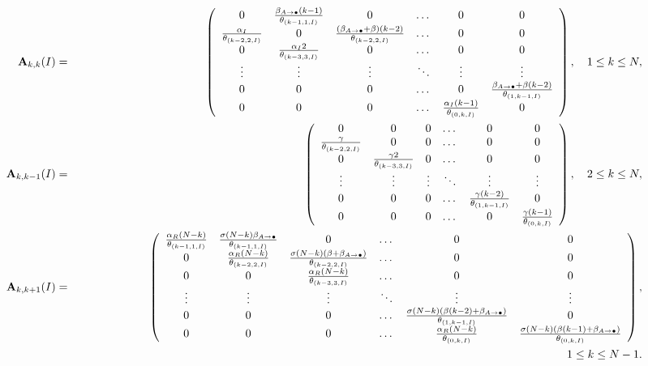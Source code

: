 \documentclass[preprint,12pt]{elsarticle}
\begin{document}
{\scriptsize
\begin{eqnarray*}
 {\bf A}_{k,k}(I) &=& \left(\begin{array}{cccccc}
0 & \frac{\beta_{A\rightarrow\bullet}(k-1)}{\theta_{(k-1,1,I)}} & 0 & \dots & 0 & 0\\
\frac{\alpha_I}{\theta_{(k-2,2,I)}} & 0 & \frac{(\beta_{A\rightarrow\bullet}+\beta)(k-2)}{\theta_{(k-2,2,I)}} & \dots & 0 & 0\\
0 & \frac{\alpha_I2}{\theta_{(k-3,3,I)}} & 0 & \dots & 0 & 0\\
\vdots & \vdots & \vdots & \ddots & \vdots & \vdots\\
0 & 0 & 0 & \dots & 0 & \frac{\beta_{A\rightarrow\bullet}+\beta(k-2)}{\theta_{(1,k-1,I)}}\\
0 & 0 & 0 & \dots & \frac{\alpha_I (k-1)}{\theta_{(0,k,I)}} & 0
                        \end{array}\right),\quad 1\leq k\leq N,\\
 {\bf A}_{k,k-1}(I) &=& \left(\begin{array}{cccccc}
0 & 0 & 0 & \dots & 0 & 0\\
\frac{\gamma}{\theta_{(k-2,2,I)}} & 0 & 0 & \dots & 0 & 0\\
0 & \frac{\gamma2}{\theta_{(k-3,3,I)}} & 0 & \dots & 0 & 0\\
\vdots & \vdots & \vdots & \ddots & \vdots & \vdots\\
0 & 0 & 0 & \dots & \frac{\gamma(k-2)}{\theta_{(1,k-1,I)}} & 0\\
0 & 0 & 0 & \dots & 0 & \frac{\gamma (k-1)}{\theta_{(0,k,I)}}
                        \end{array}\right),\quad 2\leq k\leq N,\\
 {\bf A}_{k,k+1}(I) &=& \left(\begin{array}{cccccc}
\frac{\alpha_R(N-k)}{\theta_{(k-1,1,I)}} & \frac{\sigma(N-k)\beta_{A\rightarrow\bullet}}{\theta_{(k-1,1,I)}} & 0 & \dots & 0 & 0\\
0 & \frac{\alpha_R(N-k)}{\theta_{(k-2,2,I)}} & \frac{\sigma(N-k)(\beta+\beta_{A\rightarrow\bullet})}{\theta_{(k-2,2,I)}} & \dots & 0 & 0\\
0 & 0 & \frac{\alpha_R(N-k)}{\theta_{(k-3,3,I)}} & \dots & 0 & 0\\
\vdots & \vdots & \vdots & \ddots & \vdots & \vdots\\
0 & 0 & 0 & \dots & \frac{\sigma(N-k)(\beta(k-2)+\beta_{A\rightarrow\bullet})}{\theta_{(1,k-1,I)}} & 0\\
0 & 0 & 0 & \dots & \frac{\alpha_R(N-k)}{\theta_{(0,k,I)}} & \frac{\sigma(N-k)(\beta(k-1)+\beta_{A\rightarrow\bullet})}{\theta_{(0,k,I)}}
                        \end{array}\right),\\
                        && \quad\quad\quad\quad\quad\quad\quad\quad\quad\quad\quad\quad\quad\quad\quad\quad\quad\quad\quad\quad\quad\quad\quad\quad\quad\quad\quad\quad\quad\quad\quad\quad\quad\quad\quad\quad\quad\quad\quad\quad\quad\quad\quad 1\leq k\leq N-1.
\end{eqnarray*}}
\end{document}

